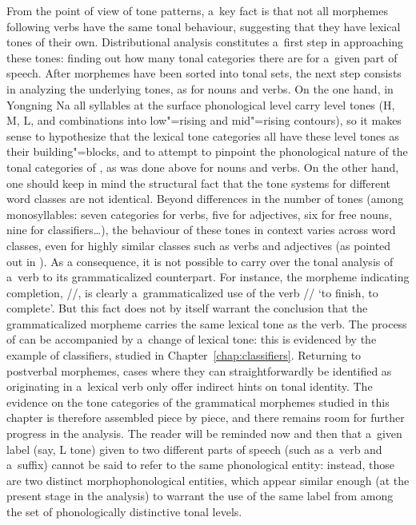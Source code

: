 From the point of view of tone patterns, a~key fact is that not all morphemes following verbs have the same tonal behaviour, suggesting that they have lexical tones of their own. Distributional analysis constitutes a~first step in approaching these tones: finding out how many tonal categories there are for a~given part of speech. After morphemes have been sorted into tonal sets, the next step consists in analyzing the underlying tones, as for nouns and verbs. On the one hand, in Yongning Na all syllables at the surface phonological level carry level tones (H, M, L, and combinations into low"=rising and mid"=rising contours), so it makes sense to hypothesize that the lexical tone categories all have these level tones as their building"=blocks, and to attempt to pinpoint the phonological nature of the tonal categories of , as was done above for nouns and verbs. On the other hand, one should keep in mind the structural fact that the tone systems for different word classes are not identical. Beyond differences in the number of tones (among monosyllables: seven categories for verbs, five for adjectives, six for free nouns, nine for classifiers{\dots}), the behaviour of these tones in context varies across word classes, even for highly similar classes such as verbs and adjectives (as pointed out in ). As a consequence, it is not possible to carry over the tonal analysis of a~verb to its grammaticalized counterpart. For instance, the morpheme indicating completion, \mbox{//}, is clearly a~grammaticalized use of the verb // ‘to finish, to complete'. But this fact does not by itself warrant the conclusion that the grammaticalized morpheme carries the same lexical tone as the verb. The process of  can be accompanied by a~change of lexical tone: this is evidenced by the example of classifiers, studied in Chapter~\ref{chap:classifiers}. Returning to postverbal morphemes, cases where they can straightforwardly be identified as originating in a~lexical verb only offer indirect hints on tonal identity. The evidence on the tone categories of the grammatical morphemes studied in this chapter is therefore assembled piece by piece, and there remains room for further progress in the analysis. The reader will be reminded now and then that a~given label (say, L tone) given to two different parts of speech (such as a~verb and a~suffix) cannot be said to refer to the same phonological entity: instead, those are two distinct morphophonological entities, which appear similar enough (at the present stage in the analysis) to warrant the use of the same label from among the set of phonologically distinctive tonal levels.

